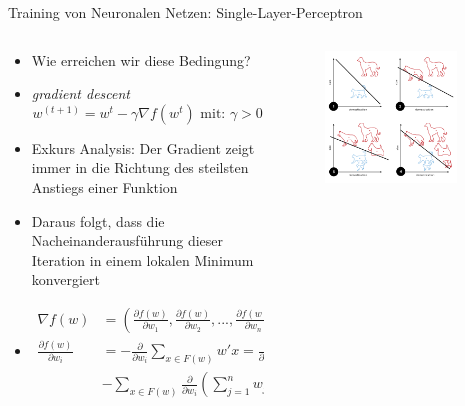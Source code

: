 \documentclass[aspectratio=1610, xcolor=dvipsnames, 9pt]{beamer}
\begin{document}
      \begin{frame}{Training von Neuronalen Netzen: Single-Layer-Perceptron}
        \begin{columns}
          \begin{column}{0.7\textwidth}
            \begin{itemize}
              \item Wie erreichen wir diese Bedingung?
              \item \emph{gradient descent}
                    \begin{equation}
                       w^{(t+1)} = w^t - \gamma \nabla f(w^t)  \text{ mit:   } \gamma>0
                    \end{equation}
              \item Exkurs Analysis: Der Gradient zeigt immer in die Richtung des steilsten Anstiegs einer Funktion
              \item Daraus folgt, dass die Nacheinanderausführung dieser Iteration in einem lokalen Minimum konvergiert 
              \item \begin{align}
                \nabla f(w) &= \left( \frac{\partial f(w)}{\partial w_1}, \frac{\partial f(w)}{\partial w_2}, ... ,\frac{\partial f(w)}{\partial w_n} \right) \\
                \frac{\partial f(w)}{\partial w_i} &= - \frac{\partial}{\partial w_i} \sum_{x \in F(w)} w'x = \frac{\partial}{\partial w_i} \sum_{x \in F(w)} \sum_{j=1}^n w_j \cdot x_j \\
                                                  & -\sum_{x \in F(w)}  \frac{\partial}{\partial w_i} \left(  \sum_{j=1}^n w_j \cdot x_j \right) = -\sum_{x \in F(w)} x_i
              \end{align}
            \end{itemize}
          \end{column}
          \begin{column}{0.3\textwidth}
       \begin{figure}
       \centering
                   \includegraphics[width=0.9\textwidth]{images/Perceptron_example.svg.png}

\end{figure}
\end{column}
\end{columns}
\end{frame}
\end{document}
